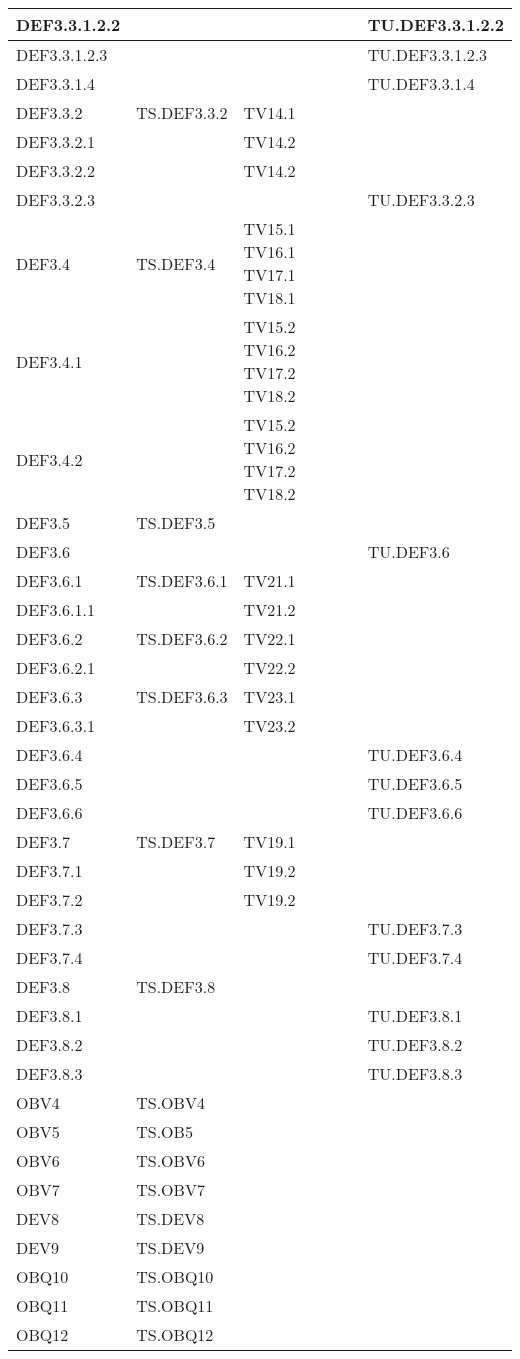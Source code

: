 \documentclass{scalatekids-article}
\begin{document}
\begin{longtable}[H]{|l|p{4cm}|p{4cm}|p{4cm}|}
  \hline
  DEF3.3.1.2.2 & & & TU.DEF3.3.1.2.2\\
  \hline
  DEF3.3.1.2.3 & & & TU.DEF3.3.1.2.3\\
  \hline
  DEF3.3.1.4 & & & TU.DEF3.3.1.4\\
  \hline
  DEF3.3.2 & TS.DEF3.3.2 & TV14.1 &\\
  \hline
  DEF3.3.2.1 & & TV14.2 &\\
  \hline
  DEF3.3.2.2 & & TV14.2 &\\
  \hline
  DEF3.3.2.3 & & & TU.DEF3.3.2.3\\ %
  \hline
  DEF3.4 & TS.DEF3.4 & TV15.1 TV16.1 TV17.1 TV18.1 &\\
  \hline
  DEF3.4.1 & & TV15.2 TV16.2 TV17.2 TV18.2 &\\
  \hline
  DEF3.4.2 & & TV15.2 TV16.2 TV17.2 TV18.2 &\\
  \hline
  DEF3.5 & TS.DEF3.5 &  & \\
  \hline
  DEF3.6 & & & TU.DEF3.6\\
  \hline
  DEF3.6.1 & TS.DEF3.6.1 & TV21.1 &\\
  \hline
  DEF3.6.1.1 & & TV21.2 &\\
  \hline
  DEF3.6.2 & TS.DEF3.6.2 & TV22.1 &\\
  \hline
  DEF3.6.2.1 & & TV22.2 &\\
  \hline
  DEF3.6.3 & TS.DEF3.6.3 & TV23.1 &\\
  \hline
  DEF3.6.3.1 & & TV23.2 &\\
  \hline
  DEF3.6.4 & & & TU.DEF3.6.4\\ %
  \hline
  DEF3.6.5 & & & TU.DEF3.6.5\\ %
  \hline
  DEF3.6.6 & & & TU.DEF3.6.6\\ %
  \hline
  DEF3.7 & TS.DEF3.7 & TV19.1 &\\
  \hline
  DEF3.7.1 & & TV19.2 &\\
  \hline
  DEF3.7.2 & & TV19.2 &\\
  \hline
  DEF3.7.3 & & & TU.DEF3.7.3\\
  \hline
  DEF3.7.4 & & & TU.DEF3.7.4\\
  \hline
  DEF3.8 & TS.DEF3.8 & & \\
  \hline
  DEF3.8.1 & & & TU.DEF3.8.1\\
  \hline
  DEF3.8.2 & & & TU.DEF3.8.2\\
  \hline
  DEF3.8.3 & & & TU.DEF3.8.3\\
  \hline
  OBV4 & TS.OBV4 & & \\
  \hline
  OBV5 & TS.OB5 & & \\
  \hline
  OBV6 & TS.OBV6 & & \\
  \hline
  OBV7 & TS.OBV7 & & \\
  \hline
  DEV8 & TS.DEV8 & & \\
  \hline
  DEV9 & TS.DEV9 & & \\
  \hline
  OBQ10 & TS.OBQ10 & & \\
  \hline
  OBQ11 & TS.OBQ11 & & \\
  \hline
  OBQ12 & TS.OBQ12 & & \\
  \hline
\end{longtable}
\end{document}
